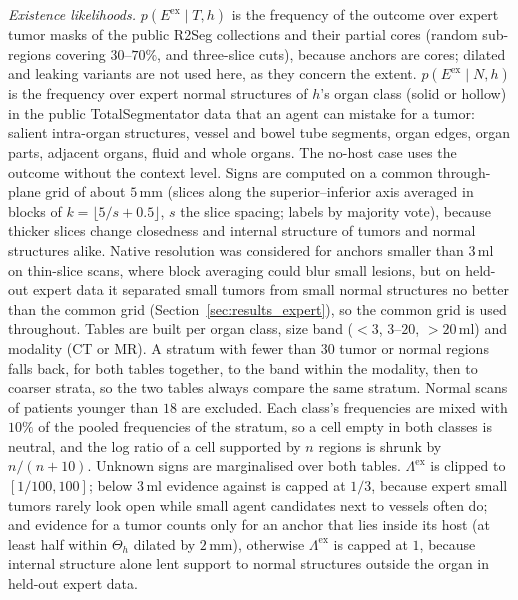 \documentclass[fleqn,10pt]{olplainarticle}
\begin{document}
\emph{Existence likelihoods.} $p(E^{\mathrm{ex}}\mid T,h)$ is the frequency of the outcome over expert tumor masks of the
public R2Seg collections and their partial cores (random sub-regions covering $30$--$70\%$, and three-slice cuts), because
anchors are cores; dilated and leaking variants are not used here, as they concern the extent. $p(E^{\mathrm{ex}}\mid N,h)$ is
the frequency over expert normal structures of $h$'s organ class (solid or hollow) in the public TotalSegmentator data that
an agent can mistake for a tumor: salient intra-organ structures, vessel and bowel tube segments, organ edges, organ parts,
adjacent organs, fluid and whole organs. The no-host case uses the outcome without the context level. Signs are computed on a
common through-plane grid of about $5$\,mm (slices along the superior--inferior axis averaged in blocks of
$k=\lfloor5/s+0.5\rfloor$, $s$ the slice spacing; labels by majority vote), because thicker slices change closedness and
internal structure of tumors and normal structures alike. Native resolution was considered for anchors smaller than $3$\,ml
on thin-slice scans, where block averaging could blur small lesions, but on held-out expert data it separated small tumors
from small normal structures no better than the common grid (Section~\ref{sec:results_expert}), so the common grid is used
throughout. Tables are built per organ class, size band ($<3$, $3$--$20$, $>20$\,ml) and
modality (CT or MR). A stratum with fewer than $30$ tumor or normal regions falls back, for both tables together, to the band
within the modality, then to coarser strata, so the two tables always compare the same stratum. Normal scans of patients
younger than $18$ are excluded. Each class's frequencies are mixed with $10\%$ of the pooled frequencies of the stratum, so a
cell empty in both classes is neutral, and the log ratio of a cell supported by $n$ regions is shrunk by $n/(n+10)$. Unknown
signs are marginalised over both tables. $\Lambda^{\mathrm{ex}}$ is clipped to $[1/100,100]$; below $3$\,ml evidence against
is capped at $1/3$, because expert small tumors rarely look open while small agent candidates next to vessels often do; and
evidence for a tumor counts only for an anchor that lies inside its host (at least half within $\Theta_h$ dilated by $2$\,mm),
otherwise $\Lambda^{\mathrm{ex}}$ is capped at $1$, because internal structure alone lent support to normal structures
outside the organ in held-out expert data.
\end{document}

